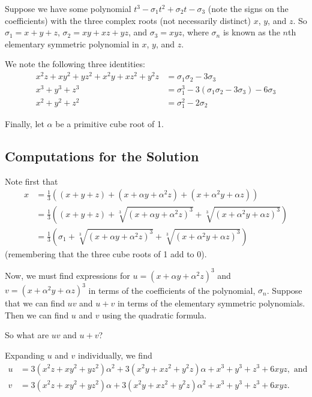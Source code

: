 \documentclass[a4paper,10pt,titlepage]{article}
\theoremstyle{definition}
\begin{document}
Suppose we have some polynomial $ t^3 - \sigma_1 t^2 + \sigma_2 t - \sigma_3 $ (note the signs
on the coefficients) with the three complex roots (not necessarily distinct) $ x $, $ y $,
and $ z $. So $ \sigma_1 = x + y + z $, $ \sigma_2 = xy + xz + yz $, and $ \sigma_3 = xyz $,
where $ \sigma_n $ is known as the $ n$th elementary symmetric polynomial in $ x $, $ y $, and $ z $.

We note the following three identities:
\begin{align*}
  x^2z + xy^2 + yz^2 + x^2y + xz^2 + y^2z &= \sigma_1\sigma_2 - 3\sigma_3\\
  x^3 + y^3 + z^3 &= \sigma_1^3 - 3(\sigma_1\sigma_2 - 3\sigma_3) - 6\sigma_3\\
  x^2 + y^2 + z^2 &= \sigma_1^2 - 2\sigma_2
\end{align*}

Finally, let $ \alpha $ be a primitive cube root of 1.

\subsection*{Computations for the Solution}
Note first that
\begin{align*}
  x &= \frac{1}{3}\left( (x + y + z) + (x + \alpha y + \alpha^2 z) + (x + \alpha^2 y + \alpha z) \right)\\
    &= \frac{1}{3}\left( (x + y + z) + \sqrt[3]{(x + \alpha y + \alpha^2 z)^3} + \sqrt[3]{(x + \alpha^2 y + \alpha z)^3} \right)\\
    &= \frac{1}{3}\left( \sigma_1 + \sqrt[3]{(x + \alpha y + \alpha^2 z)^3} + \sqrt[3]{(x + \alpha^2 y + \alpha z)^3} \right)
\end{align*}
(remembering that the three cube roots of 1 add to 0).

Now, we must find expressions for $ u = (x + \alpha y + \alpha^2 z)^3 $ and $ v = (x + \alpha^2 y + \alpha z)^3 $ in terms of
the coefficients of the polynomial, $ \sigma_n $. Suppose that we can find $ uv $ and $ u + v $ in terms of the elementary
symmetric polynomials. Then we can find $ u $ and $ v $ using the quadratic formula.

So what are $ uv $ and $ u + v $?

Expanding $ u $ and $ v $ individually, we find
\begin{align*}
  u &= 3(x^2z + xy^2 + yz^2)\alpha^2 + 3(x^2y + xz^2 + y^2z)\alpha + x^3 + y^3 + z^3 + 6xyz, \text{ and}\\
  v &= 3(x^2z + xy^2 + yz^2)\alpha + 3(x^2y + xz^2 + y^2z)\alpha^2 + x^3 + y^3 + z^3 + 6xyz.
\end{align*}
\end{document}

